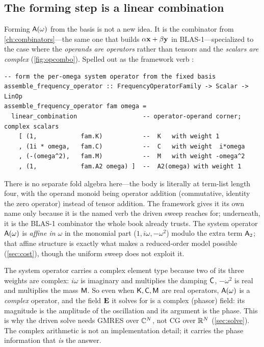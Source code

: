 \subsection{The forming step is a linear combination}

Forming $\mathsf{A}(\omega)$ from the basis is not a new idea. It is the
 combinator from \cref{ch:combinators}---the same one
that builds $\alpha\mathbf{x} + \beta\mathbf{y}$ in BLAS-1---specialized to the case where the
\emph{operands are operators} rather than tensors and the \emph{scalars are
complex} (\cref{fig:opcombo}). Spelled out as the framework verb
:
\begin{lstlisting}[style=l4style]
-- form the per-omega system operator from the fixed basis
assemble_frequency_operator :: FrequencyOperatorFamily -> Scalar -> LinOp
assemble_frequency_operator fam omega =
  linear_combination                  -- operator-operand corner; complex scalars
    [ (1,            fam.K)           --  K   with weight 1
    , (1i * omega,   fam.C)           --  C   with weight  i*omega
    , (-(omega^2),   fam.M)           --  M   with weight -omega^2
    , (1,            fam.A2 omega) ]  --  A2(omega) with weight 1
\end{lstlisting}
There is no separate fold algebra here---the body is literally
 at term-list length four, with the operand monoid being
operator addition (commutative, identity the zero operator) instead of tensor
addition. The framework gives it its own name only because it is the named verb the
driven sweep reaches for; underneath, it is the BLAS-1 combinator the whole book
already trusts. The system operator $\mathsf{A}(\omega)$ is \emph{affine in $\omega$}
in the monomial part ($1, i\omega, -\omega^2$) modulo the extra term
$\mathsf{A}_2$; that affine structure is exactly what makes a reduced-order model
possible (\cref{sec:cost}), though the uniform sweep does not exploit it.

\begin{notationbox}
The system operator carries a complex element type because two of its three
weights are complex: $i\omega$ is imaginary and multiplies the damping $\mathsf{C}$,
$-\omega^2$ is real and multiplies the mass $\mathsf{M}$. So even when $\mathsf{K},\mathsf{C},\mathsf{M}$
are real operators, $\mathsf{A}(\omega)$ is a \emph{complex} operator, and the field
$\mathbf{E}$ it solves for is a complex (phasor) field: its magnitude is the amplitude of
the oscillation and its argument is the phase. This is why the driven solve needs
GMRES over $\mathbb{C}^N$, not CG over $\mathbb{R}^N$ (\cref{sec:solve}). The complex
arithmetic is not an implementation detail; it carries the phase information that
\emph{is} the answer.
\end{notationbox}

